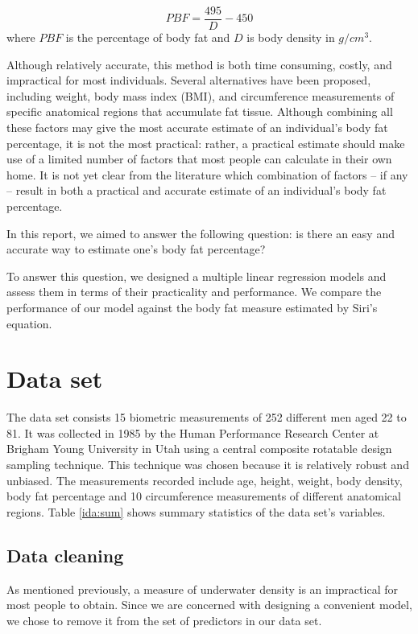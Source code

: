 \documentclass[letterpaper,9pt,twocolumn,twoside,]{pinp}
\begin{document}
\[
    PBF = \frac{495}{D} - 450
\] where \(PBF\) is the percentage of body fat and \(D\) is body density
in \(g/cm^3\).

Although relatively accurate, this method is both time consuming,
costly, and impractical for most individuals. Several alternatives have
been proposed, including weight, body mass index (BMI), and
circumference measurements of specific anatomical regions that
accumulate fat tissue. Although combining all these factors may give the
most accurate estimate of an individual's body fat percentage, it is not
the most practical: rather, a practical estimate should make use of a
limited number of factors that most people can calculate in their own
home. It is not yet clear from the literature which combination of
factors -- if any -- result in both a practical and accurate estimate of
an individual's body fat percentage.

In this report, we aimed to answer the following question: is there an
easy and accurate way to estimate one's body fat percentage?

To answer this question, we designed a multiple linear regression models
and assess them in terms of their practicality and performance. We
compare the performance of our model against the body fat measure
estimated by Siri's equation.

\hypertarget{data-set}{%
\section{Data set}\label{data-set}}

The data set \citep{dataset1985} consists 15 biometric measurements of
252 different men aged 22 to 81. It was collected in 1985 by the Human
Performance Research Center at Brigham Young University in Utah using a
central composite rotatable design sampling technique. This technique
was chosen because it is relatively robust and unbiased. The
measurements recorded include age, height, weight, body density, body
fat percentage and 10 circumference measurements of different anatomical
regions. Table \ref{ida:sum} shows summary statistics of the data set's
variables.

\hypertarget{data-cleaning}{%
\subsection{Data cleaning}\label{data-cleaning}}

As mentioned previously, a measure of underwater density is an
impractical for most people to obtain. Since we are concerned with
designing a convenient model, we chose to remove it from the set of
predictors in our data set.
\end{document}
